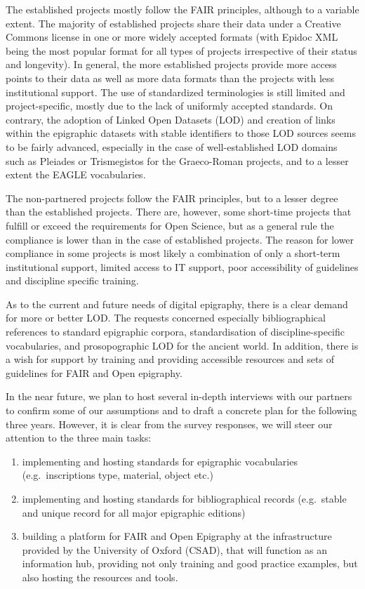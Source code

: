 \documentclass[
  12pt,
]{scrreprt}
\providecommand{\tightlist}{%
  \setlength{\itemsep}{0pt}\setlength{\parskip}{0pt}}
\begin{document}
The established projects mostly follow the FAIR principles, although to
a variable extent. The majority of established projects share their data
under a Creative Commons license in one or more widely accepted formats
(with Epidoc XML being the most popular format for all types of projects
irrespective of their status and longevity). In general, the more
established projects provide more access points to their data as well as
more data formats than the projects with less institutional support. The
use of standardized terminologies is still limited and project-specific,
mostly due to the lack of uniformly accepted standards. On contrary, the
adoption of Linked Open Datasets (LOD) and creation of links within the
epigraphic datasets with stable identifiers to those LOD sources seems
to be fairly advanced, especially in the case of well-established LOD
domains such as Pleiades or Trismegistos for the Graeco-Roman projects,
and to a lesser extent the EAGLE vocabularies.

The non-partnered projects follow the FAIR principles, but to a lesser
degree than the established projects. There are, however, some
short-time projects that fulfill or exceed the requirements for Open
Science, but as a general rule the compliance is lower than in the case
of established projects. The reason for lower compliance in some
projects is most likely a combination of only a short-term institutional
support, limited access to IT support, poor accessibility of guidelines
and discipline specific training.

As to the current and future needs of digital epigraphy, there is a
clear demand for more or better LOD. The requests concerned especially
bibliographical references to standard epigraphic corpora,
standardisation of discipline-specific vocabularies, and prosopographic
LOD for the ancient world. In addition, there is a wish for support by
training and providing accessible resources and sets of guidelines for
FAIR and Open epigraphy.

In the near future, we plan to host several in-depth interviews with our
partners to confirm some of our assumptions and to draft a concrete plan
for the following three years. However, it is clear from the survey
responses, we will steer our attention to the three main tasks:

\begin{enumerate}
\def\labelenumi{\arabic{enumi}.}
\tightlist
\item
  implementing and hosting standards for epigraphic vocabularies
  (e.g.~inscriptions type, material, object etc.)
\item
  implementing and hosting standards for bibliographical records
  (e.g.~stable and unique record for all major epigraphic editions)
\item
  building a platform for FAIR and Open Epigraphy at the infrastructure
  provided by the University of Oxford (CSAD), that will function as an
  information hub, providing not only training and good practice
  examples, but also hosting the resources and tools.
\end{enumerate}
\end{document}
